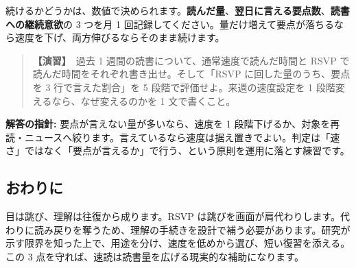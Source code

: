 \documentclass{article}
\begin{document}
続けるかどうかは、数値で決められます。\textbf{読んだ量}、\textbf{翌日に言える要点数}、\textbf{読書への継続意欲}の 3 つを月 1 回記録してください。量だけ増えて要点が落ちるなら速度を下げ、両方伸びるならそのまま続けます。

\begin{quote}
\textbf{【演習】}\ 過去 1 週間の読書について、通常速度で読んだ時間と RSVP で読んだ時間をそれぞれ書き出せ。そして「RSVP に回した量のうち、要点を 3 行で言えた割合」を 5 段階で評価せよ。来週の速度設定を 1 段階変えるなら、なぜ変えるのかを 1 文で書くこと。
\end{quote}

\textbf{解答の指針:} 要点が言えない量が多いなら、速度を 1 段階下げるか、対象を再読・ニュースへ絞ります。言えているなら速度は据え置きでよい。判定は「速さ」ではなく「要点が言えるか」で行う、という原則を運用に落とす練習です。

\subsection{おわりに}

目は跳び、理解は往復から成ります。RSVP は跳びを画面が肩代わりします。代わりに読み戻りを奪うため、理解の手続きを設計で補う必要があります。研究が示す限界を知った上で、用途を分け、速度を低めから選び、短い復習を添える。この 3 点を守れば、速読は読書量を広げる現実的な補助になります。
\end{document}
